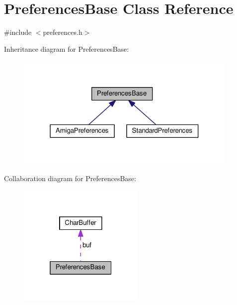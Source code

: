 \hypertarget{classPreferencesBase}{}\section{Preferences\+Base Class Reference}
\label{classPreferencesBase}


{\ttfamily \#include $<$preferences.\+h$>$}



Inheritance diagram for Preferences\+Base\+:
\nopagebreak
\begin{figure}[H]
\begin{center}
\leavevmode
\includegraphics[width=304pt]{d4/dd8/classPreferencesBase__inherit__graph}
\end{center}
\end{figure}


Collaboration diagram for Preferences\+Base\+:
\nopagebreak
\begin{figure}[H]
\begin{center}
\leavevmode
\includegraphics[width=172pt]{d0/d34/classPreferencesBase__coll__graph}
\end{center}
\end{figure}
